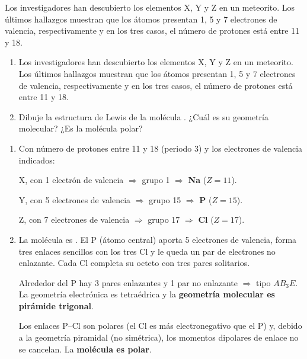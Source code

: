 \begin{exerciseEVAU}
    Los investigadores han descubierto los elementos X, Y y Z en un meteorito. Los últimos hallazgos muestran
    que los átomos presentan 1, 5 y 7 electrones de valencia, respectivamente y en los tres casos, el número
    de protones está entre 11 y 18.
    \begin{enumerate}[label=\letraminuscula]
    \item Los investigadores han descubierto los elementos X, Y y Z en un meteorito. Los últimos hallazgos muestran que los átomos presentan 1, 5 y 7 electrones de valencia, respectivamente y en los tres casos, el número de protones está entre 11 y 18.
    \item Dibuje la estructura de Lewis de la molécula . ¿Cuál es su geometría molecular? ¿Es la
    molécula polar?
    \end{enumerate}
    \begin{solu}
        \begin{enumerate}[label=\letraminuscula]
            \item Con número de protones entre 11 y 18 (periodo 3) y los electrones de valencia indicados:

            X, con 1 electrón de valencia $\Rightarrow$ grupo 1 $\Rightarrow$ \textbf{Na} (\(Z=11\)).

            Y, con 5 electrones de valencia $\Rightarrow$ grupo 15 $\Rightarrow$ \textbf{P} (\(Z=15\)).

            Z, con 7 electrones de valencia $\Rightarrow$ grupo 17 $\Rightarrow$ \textbf{Cl} (\(Z=17\)).

            \item La molécula  es . El P (átomo central) aporta 5 electrones de valencia, forma tres enlaces sencillos con los tres Cl y le queda un par de electrones no enlazante. Cada Cl completa su octeto con tres pares solitarios.

            Alrededor del P hay 3 pares enlazantes y 1 par no enlazante $\Rightarrow$ tipo \(AB_3E\). La geometría electrónica es tetraédrica y la \textbf{geometría molecular es pirámide trigonal}.

            Los enlaces P--Cl son polares (el Cl es más electronegativo que el P) y, debido a la geometría piramidal (no simétrica), los momentos dipolares de enlace no se cancelan. La \textbf{molécula es polar}.
        \end{enumerate}
    \end{solu}
\end{exerciseEVAU}

